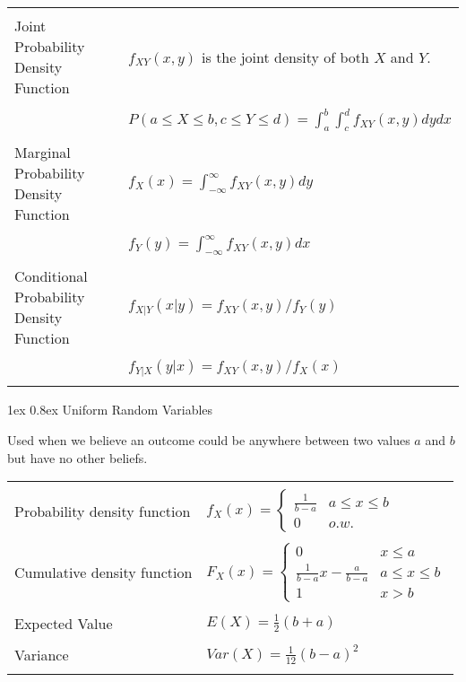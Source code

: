 \documentclass[10pt,landscape]{article}
\makeatletter
\renewcommand{\subsection}{\@startsection{subsection}{2}{0mm}%
                                {1ex} %
                                {0.8ex} %
                                {\normalfont\normalsize\bfseries}}
\makeatother
\begin{document}
\begin{multicols}{2}
\begin{tabular}{@{}ll@{}}
        & \\
   Joint Probability Density Function & $f_{XY}(x, y)$ is the joint density of both $X$ and $Y$. \\
        & \\
                              & $ P(a \le X \le b, c \le Y \le d) = \int_{a}^{b} \int_{c}^{d} f_{XY}(x,y) dy dx $\\
        & \\
   Marginal Probability Density Function & $f_X(x) = \int_{-\infty}^{\infty} f_{XY}(x,y) dy$ \\
        & \\
                                         & $f_Y(y) = \int_{-\infty}^{\infty} f_{XY}(x,y) dx$ \\
        & \\
   Conditional Probability Density Function & $f_{X|Y}(x|y) = f_{XY}(x,y)/f_{Y}(y)$ \\
        & \\
                                    & $f_{Y|X}(y|x) = f_{XY}(x,y)/f_{X}(x)$ \\
        & \\
\end{tabular}


\subsection{Uniform Random Variables}

Used when we believe an outcome could be anywhere between two values $a$ and $b$ but have no other beliefs.

\begin{tabular}{@{}ll@{}}
        & \\
   Probability density function & $f_X(x) = \begin{cases} \frac{1}{b-a} & a \le x \le b \\ 0 & o.w. \end{cases}$ \\
        & \\
      Cumulative density function & $F_X(x) = \begin{cases} 0 & x \le a \\ \frac{1}{b-a} x - \frac{a}{b-a} & a \le x \le b \\ 1 & x > b \end{cases}$ \\
        & \\
      Expected Value & $E(X) = \frac{1}{2}(b+a)$ \\
        & \\
      Variance & $Var(X) = \frac{1}{12}(b-a)^2$ \\
        & \\
\end{tabular}


\end{multicols}
\end{document}
